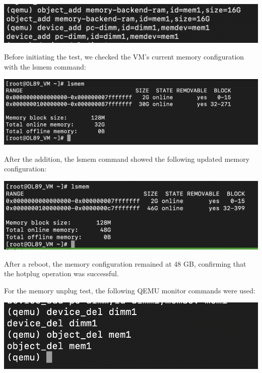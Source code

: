 \begin{center}
    \centering
    \includegraphics[width=\textwidth]{Images/Memory Hotplug.png}
    \label{fig}
\end{center}

Before initiating the test, we checked the VM's current memory configuration with the lsmem command:

\begin{center}
    \centering
    \includegraphics[width=\textwidth]{Images/lsmem after unplug.png}
    \label{fig}
\end{center}

After the addition, the lsmem command showed the following updated memory configuration:

\begin{center}
    \centering
    \includegraphics[width=\textwidth]{Images/lsmem after hotplug.png}
    \label{fig}
\end{center}

After a reboot, the memory configuration remained at 48 GB, confirming that the hotplug operation was successful.\mynewline

For the memory unplug test, the following QEMU monitor commands were used:

\begin{center}
    \centering
    \includegraphics[width=\textwidth]{Images/Memory Unplug.png}
    \label{fig}
\end{center}

